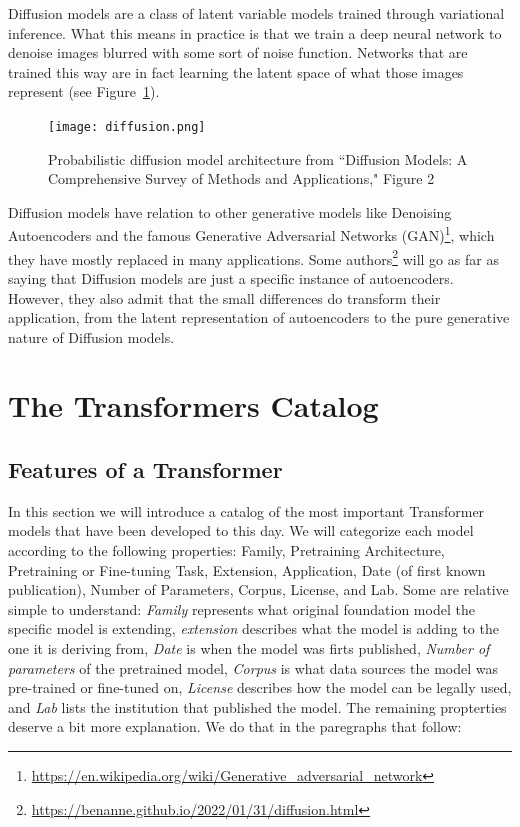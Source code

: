 \documentclass{article}
\begin{document}
Diffusion models are a class of latent variable models trained through variational inference. What this means in practice is that we train a deep neural network to denoise images blurred with some sort of noise function. Networks that are trained this way are in fact learning the latent space of what those images represent (see Figure~\ref{fig:diffusion}).

\begin{figure}
    \centering
    \texttt{[image: diffusion.png]}
    \caption{Probabilistic diffusion model architecture from “Diffusion Models: A Comprehensive Survey of Methods and Applications," Figure 2 \protect{} }
    \label{fig:diffusion}
\end{figure}


Diffusion models have relation to other generative models like Denoising Autoencoders and the famous Generative Adversarial Networks (GAN)\footnote{\url{https://en.wikipedia.org/wiki/Generative_adversarial_network}}, which they have mostly replaced in many applications. Some authors\footnote{\url{https://benanne.github.io/2022/01/31/diffusion.html}} will go as far as saying that Diffusion models are just a specific instance of autoencoders. However, they also admit that the small differences do transform their application, from the latent representation of autoencoders to the pure generative nature of Diffusion models.

\section{The Transformers Catalog}


\subsection{Features of a Transformer}

In this section we will introduce a catalog of the most important Transformer models that have been developed to this day. We will categorize each model according to the following properties: Family, Pretraining Architecture, Pretraining or Fine-tuning Task, Extension, Application, Date (of first known publication), Number of Parameters, Corpus, License, and Lab. Some are relative simple to understand: \emph{Family} represents what original foundation model the specific model is extending, \emph{extension} describes what the model is adding to the one it is deriving from, \emph{Date} is when the model was firts published, \emph{Number of parameters} of the pretrained model, \emph{Corpus} is what data sources the model was pre-trained or fine-tuned on, \emph{License} describes how the model can be legally used, and \emph{Lab} lists the institution that published the model. The remaining propterties deserve a bit more explanation. We do that in the paregraphs that follow: 
\end{document}
